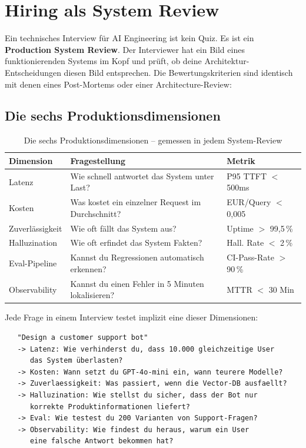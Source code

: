 \section{Hiring als System Review}

Ein technisches Interview für AI Engineering ist kein Quiz. Es ist ein \textbf{Production System Review}. Der Interviewer hat ein Bild eines funktionierenden Systems im Kopf und prüft, ob deine Architektur-Entscheidungen diesen Bild entsprechen. Die Bewertungskriterien sind identisch mit denen eines Post-Mortems oder einer Architecture-Review:

\subsection{Die sechs Produktionsdimensionen}

\begin{table}[H]
\centering
\begin{tabularx}{\linewidth}{lXl}
\toprule
\textbf{Dimension} & \textbf{Fragestellung} & \textbf{Metrik} \\
\midrule
Latenz & Wie schnell antwortet das System unter Last? & P95 TTFT $<$ 500ms \\
Kosten & Was kostet ein einzelner Request im Durchschnitt? & EUR/Query $<$ 0,005 \\
Zuverlässigkeit & Wie oft fällt das System aus? & Uptime $>$ 99,5\,\% \\
Halluzination & Wie oft erfindet das System Fakten? & Hall. Rate $<$ 2\,\% \\
Eval-Pipeline & Kannst du Regressionen automatisch erkennen? & CI-Pass-Rate $>$ 90\,\% \\
Observability & Kannst du einen Fehler in 5 Minuten lokalisieren? & MTTR $<$ 30 Min \\
\bottomrule
\end{tabularx}
\caption{Die sechs Produktionsdimensionen -- gemessen in jedem System-Review}
\label{tab:prod-dims}
\end{table}

Jede Frage in einem Interview testet implizit eine dieser Dimensionen:

\begin{verbatim}
   "Design a customer support bot"
   -> Latenz: Wie verhinderst du, dass 10.000 gleichzeitige User
      das System überlasten?
   -> Kosten: Wann setzt du GPT-4o-mini ein, wann teurere Modelle?
   -> Zuverlaessigkeit: Was passiert, wenn die Vector-DB ausfaellt?
   -> Halluzination: Wie stellst du sicher, dass der Bot nur
      korrekte Produktinformationen liefert?
   -> Eval: Wie testest du 200 Varianten von Support-Fragen?
   -> Observability: Wie findest du heraus, warum ein User
      eine falsche Antwort bekommen hat?
\end{verbatim}

